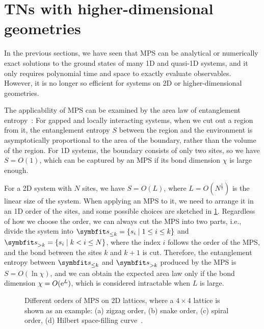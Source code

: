 \section{TNs with higher-dimensional geometries}

In the previous sections, we have seen that MPS can be analytical or numerically exact solutions to the ground states of many 1D and quasi-1D systems, and it only requires polynomial time and space to exactly evaluate observables. However, it is no longer so efficient for systems on 2D or higher-dimensional geometries.

The applicability of MPS can be examined by the area law of entanglement entropy~\cite{srednicki1993entropy, verstraete2006criticality, hastings2007area, eisert2010colloquium}: For gapped and locally interacting systems, when we cut out a region from it, the entanglement entropy $S$ between the region and the environment is asymptotically proportional to the area of the boundary, rather than the volume of the region. For 1D systems, the boundary consists of only two sites, so we have $S = O(1)$, which can be captured by an MPS if its bond dimension $\chi$ is large enough.

For a 2D system with $N$ sites, we have $S = O(L)$, where $L = O(N^\frac{1}{2})$ is the linear size of the system. When applying an MPS to it, we need to arrange it in an 1D order of the sites, and some possible choices are sketched in \cref{fig:mps-order}. Regardless of how we choose the order, we can always cut the MPS into two parts, i.e., divide the system into $\vs_{\le k} = \{s_i \mid 1 \le i \le k\}$ and $\vs_{> k} = \{s_i \mid k < i \le N\}$, where the index $i$ follows the order of the MPS, and the bond between the sites $k$ and $k + 1$ is cut. Therefore, the entanglement entropy between $\vs_{\le k}$ and $\vs_{> k}$ produced by the MPS is $S = O(\ln \chi)$, and we can obtain the expected area law only if the bond dimension $\chi = O(\mathrm{e}^L)$, which is considered intractable when $L$ is large.

\begin{figure}[htb]
\centering
\hspace*{\fill}
\hspace*{\fill}
\hspace*{\fill}
\hspace*{\fill}
\hspace*{\fill}
\caption[Orders of MPS on 2D lattice]{
Different orders of MPS on 2D lattices, where a $4 \times 4$ lattice is shown as an example: (a) zigzag order, (b) snake order, (c) spiral order, (d) Hilbert space-filling curve~\cite{hilbert1891uber}.
}
\label{fig:mps-order}
\end{figure}


